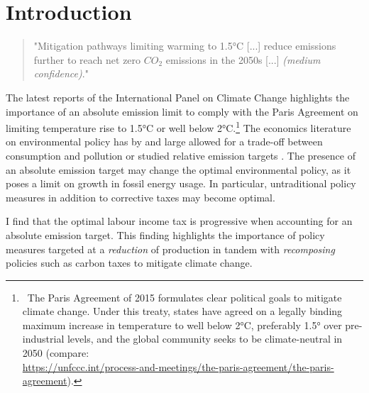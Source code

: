 \section{Introduction}

\begin{quote}
"Mitigation pathways limiting warming to 1.5°C [...]  reduce emissions further to reach net zero $CO_2$ emissions in the 2050s [...] \textit{(medium confidence)}."
\end{quote}

The latest reports of the International Panel on Climate Change \citep{ IPCC2022, Rogelj2018MitigationDevelopment.} highlights the importance of an absolute emission limit to comply with the Paris Agreement on limiting temperature rise to 1.5°C or well below 2°C.\footnote{ \ The Paris Agreement of 2015 formulates clear political goals to mitigate climate change. Under this treaty, states have agreed on a legally binding maximum increase in temperature to well below 2°C, preferably 1.5° over pre-industrial levels, and the global community seeks to be climate-neutral in 2050  (compare:\\ \url{https://unfccc.int/process-and-meetings/the-paris-agreement/the-paris-agreement}). 
} 
The economics literature on environmental policy has by and large allowed for a trade-off between consumption and pollution \citep{Barrage2019OptimalPolicy, Golosov2014OptimalEquilibrium} or studied relative emission targets \citep{Fried2018ClimateAnalysis}. 
The presence of an absolute emission target may change the optimal environmental policy, as it poses a limit on growth in fossil energy usage.
In particular, untraditional policy measures in addition to corrective taxes may become optimal. %

 I find that the optimal labour income tax is progressive when accounting for an absolute emission target. This finding highlights the importance of policy measures targeted at a \textit{reduction} of production in tandem with \textit{recomposing} policies such as carbon taxes to mitigate climate change. %


